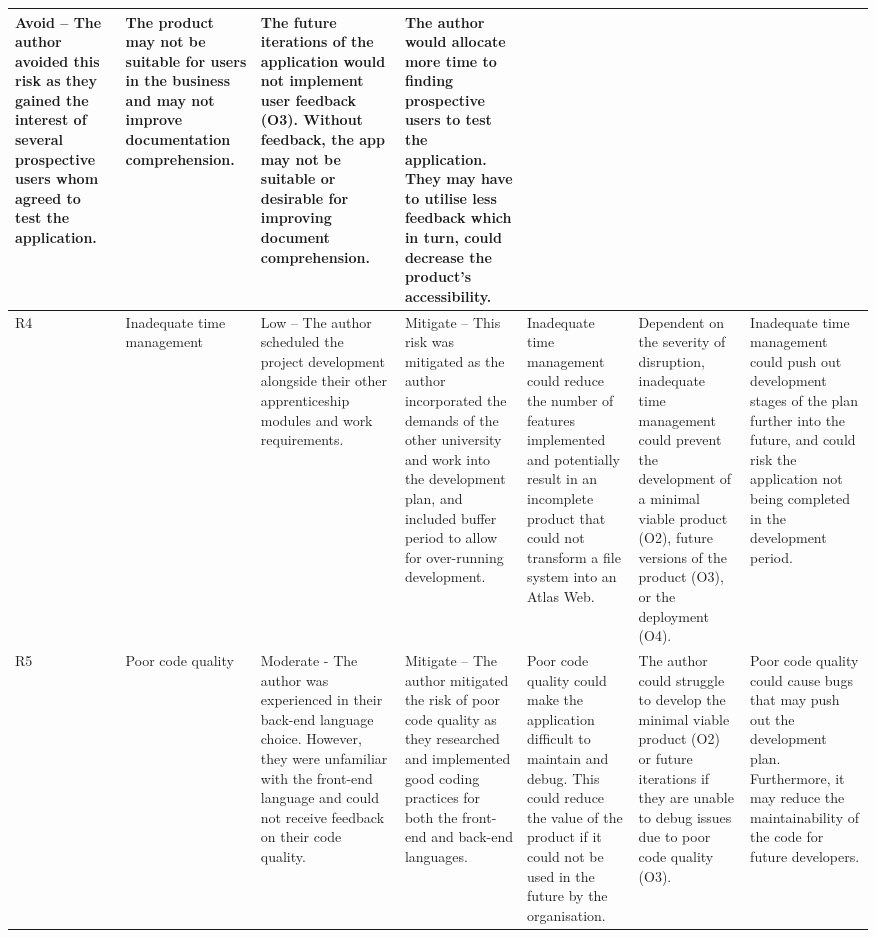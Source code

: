 \documentclass{article}
\begin{document}
\begin{landscape}
\begin{longtable}{|p{0.6cm}|p{2cm}|p{3.3cm}|p{3.3cm}|p{3cm}|p{3.5cm}|p{3.3cm}|}
  Avoid – The author avoided this risk as they gained the interest of several prospective users whom agreed to test the application. &
  The product may not be suitable for users in the business and may not improve documentation comprehension. &
  The future iterations of the application would not implement user feedback (O3). Without feedback, the app may not be suitable or desirable for improving document   comprehension. &
  The author would allocate more time to finding prospective users to test the application. They may have to utilise less feedback which in turn, could decrease the product's accessibility. \\ \hline
\rowcolor[HTML]{92D050} 
R4 &
  Inadequate time management &
  Low – The author scheduled the project development alongside their other apprenticeship modules and work requirements. &
  Mitigate – This risk was mitigated as the author incorporated the demands of the other university and work into the development plan, and included buffer period to allow for over-running development. &
  Inadequate time management could reduce the number of features implemented and potentially result in an incomplete product that could not transform a file system into an Atlas Web. &
  Dependent on the severity of disruption, inadequate time management could prevent the development of a minimal viable product (O2), future versions of the product   (O3), or the deployment (O4). &
  Inadequate time   management could push out development stages of the plan further into the future, and could risk the application not being completed in the development period. \\ \hline
\rowcolor[HTML]{FFC000} 
R5 &
  Poor code quality &
  Moderate - The author was experienced in their back-end language choice. However, they were unfamiliar with the front-end language and could not receive feedback on their code quality. &
  Mitigate – The author mitigated the risk of poor code quality as they researched and implemented good coding practices for both the front-end and back-end   languages. &
  Poor code quality could make the application difficult to maintain and debug. This could reduce the value of the product if it could not be used in the future by the organisation. &
  The author could struggle to develop the minimal viable product (O2) or future iterations if they are unable to debug issues due to poor code quality (O3). &
  Poor code quality could cause bugs that may push out the development plan. Furthermore, it may reduce the maintainability of the code for future developers. \\ \hline

\end{longtable}
\end{landscape}
\end{document}
